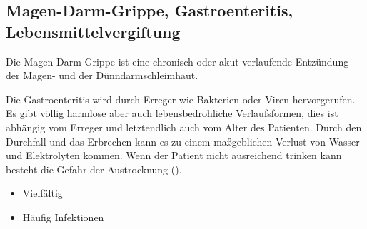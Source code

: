 \textleaf



% 
% 






\subsection{Magen-Darm-Grippe, Gastroenteritis,
Lebensmittelvergiftung}
\label{topic:gastroenteritis}
\label{topic:lebensmittelvergiftung}



Die Magen-Darm-Grippe ist eine chronisch oder akut
verlaufende Entzündung der Magen- und der Dünndarmschleimhaut. 

{%
Die Gastroenteritis wird durch Erreger wie Bakterien oder
Viren hervorgerufen. Es gibt völlig harmlose aber auch
lebensbedrohliche Verlaufsformen, dies ist abhängig vom
Erreger und letztendlich auch vom Alter des Patienten. Durch
den Durchfall und das Erbrechen kann es zu einem maßgeblichen
Verlust von Wasser und Elektrolyten kommen. Wenn der Patient
nicht ausreichend trinken kann besteht die Gefahr der
Austrocknung (). 
}{
\begin{itemize}
  \item Vielfältig
  \item Häufig Infektionen
\end{itemize}
}{}{}{}


